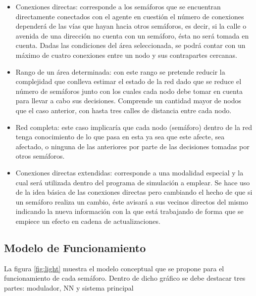 \begin{itemize}
	\item Conexiones directas: corresponde a los sem\'{a}foros que se encuentran directamente conectados con el agente en cuesti\'{o}n el n\'{u}mero de conexiones depender\'{a} de las v\'{i}as que hayan hacia otros sem\'{a}foros, es decir, si la calle o avenida de una direcci\'{o}n no cuenta con un sem\'{a}foro, \'{e}sta no ser\'{a} tomada en cuenta. Dadas las condiciones del \'{a}rea seleccionada, se podr\'{a} contar con un m\'{a}ximo de cuatro conexiones entre un nodo y sus contrapartes cercanas. 
	\item Rango de un \'{a}rea determinada: con este rango se pretende reducir la complejidad que conlleva estimar el estado de la red dado que se reduce el n\'{u}mero de sem\'{a}foros junto con los cuales cada nodo debe tomar en cuenta para llevar a cabo sus decisiones. Comprende un cantidad mayor de nodos que el caso anterior, con hasta tres calles de distancia entre cada nodo.
	
	\item Red completa: este caso implicar\'{i}a que cada nodo (sem\'{a}foro) dentro de la red tenga conocimiento de lo que pasa en esta ya sea que este afecte, sea afectado, o ninguna de las anteriores por parte de las decisiones tomadas por otros sem\'{a}foros.
	
	\item Conexiones directas extendidas: corresponde a una modalidad especial y la cual ser\'{a} utilizada dentro del programa de simulaci\'{o}n a emplear. Se hace uso de la idea b\'{a}sica de las conexiones directas pero cambiando el hecho de que si un sem\'{a}foro realiza un cambio, \'{e}ste avisar\'{a} a sus vecinos directos del mismo indicando la nueva informaci\'{o}n con la que est\'{a} trabajando de forma que se empiece un efecto en cadena de actualizaciones.

\end{itemize}


\subsection{Modelo de Funcionamiento}

La figura \ref{fig:light} muestra el modelo conceptual que se propone para el funcionamiento de cada sem\'{a}foro. Dentro de dicho gr\'{a}fico se debe destacar tres partes: modulador, NN y sistema principal

